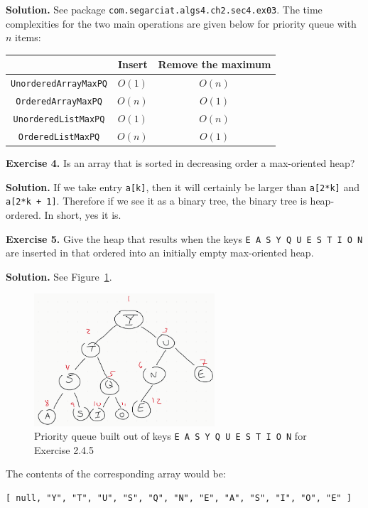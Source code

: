 \documentclass[12pt, a4paper]{article}
\newenvironment{ex}[2][Exercise]
{\par\medskip\noindent \textbf{#1 #2.}}
{\medskip}
\newenvironment{sol}[1][Solution]
{\par\medskip\noindent \textbf{#1.} }
{\medskip}
\begin{document}
	\begin{sol}
		See package \texttt{com.segarciat.algs4.ch2.sec4.ex03}. The time complexities
		for the two main operations are given below for priority queue with $n$ items:
		\begin{center}
			\begin{tabular}{c|c|c}
				{} & Insert & Remove the maximum\\
				\hline
				\texttt{UnorderedArrayMaxPQ} & $O(1)$ & $O(n)$ \\
				\hline
				\texttt{OrderedArrayMaxPQ} & $O(n)$ & $O(1)$\\
				\hline
				\texttt{UnorderedListMaxPQ} & $O(1)$ & $O(n)$ \\
				\hline
				\texttt{OrderedListMaxPQ} & $O(n)$ & $O(1)$
			\end{tabular}
		\end{center}
	\end{sol}
	\begin{ex}{4}
		Is an  array that is sorted in decreasing order a max-oriented heap?
	\end{ex}
	\begin{sol}
		If we take entry \texttt{a[k]}, then it will certainly be larger than
		\texttt{a[2*k]} and \texttt{a[2*k + 1]}. Therefore if we see it as a
		binary tree, the binary tree is heap-ordered. In short, yes it is.
	\end{sol}
	\begin{ex}{5}
		Give the heap that results when the keys \texttt{E A S Y Q U E S T I O N}
		are inserted in that ordered into an initially empty max-oriented heap.
	\end{ex}
	\begin{sol}
		See Figure~\ref{fig:ex-05}.
		\begin{figure}
			\centering
			\includegraphics[width=0.6\textwidth]{exercise-05}
			\caption{Priority queue built out of keys \texttt{E A S Y Q U E S T I O N}
				for Exercise 2.4.5}
			\label{fig:ex-05}
		\end{figure}
		
		The contents of the corresponding array would be:
		\begin{lstlisting}[language={}]
[ null, "Y", "T", "U", "S", "Q", "N", "E", "A", "S", "I", "O", "E" ]
		\end{lstlisting}
	\end{sol}
\end{document}
